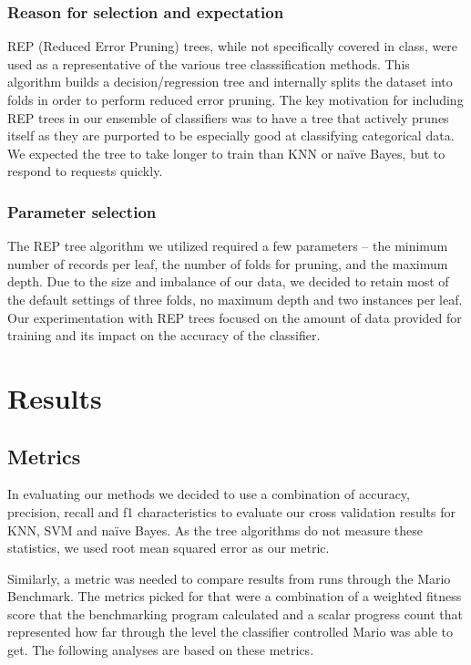 \documentclass[]{article}   %
\begin{document}
\subsubsection{Reason for selection and expectation}
REP (Reduced Error Pruning) trees, while not specifically covered in class, were used as a representative of the 
various tree classsification methods. This algorithm builds a decision/regression tree and internally splits the 
dataset into folds in order to perform reduced error pruning. The key motivation for including REP trees in our 
ensemble of classifiers was to have a tree that actively prunes itself as they are purported to be especially good 
at classifying categorical data. We expected the tree to take longer to train than KNN or na\"{i}ve Bayes, but to 
respond to requests quickly.

\subsubsection{Parameter selection}
The REP tree algorithm we utilized required a few parameters -- the minimum number of records per leaf, the number 
of folds for pruning, and the maximum depth. Due to the size and imbalance of our data, we decided to retain most 
of the default settings of three folds, no maximum depth and two instances per leaf. Our experimentation with REP 
trees focused on the amount of data provided for training and its impact on the accuracy of the classifier.

\section{Results}
\subsection{Metrics}
In evaluating our methods we decided to use a combination of accuracy, precision, recall and f1 characteristics to 
evaluate our cross validation results for KNN, SVM and na\"{i}ve Bayes. As the tree algorithms do not measure these
statistics, we used root mean squared error as our metric.

Similarly, a metric was needed to compare results from runs through the Mario 
Benchmark. The metrics picked for that were a combination of a weighted fitness score that the benchmarking program 
calculated and a scalar progress count that represented how far through the level the classifier controlled Mario was 
able to get. The following analyses are based on these metrics.
\end{document}
